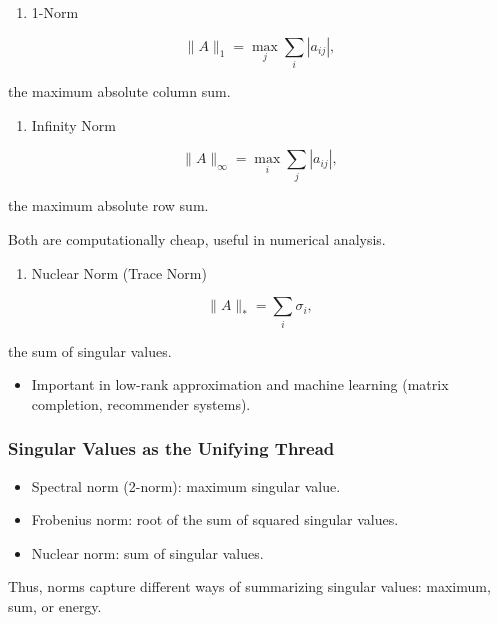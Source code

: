 \documentclass[
  letterpaper,
  DIV=11,
  numbers=noendperiod]{scrreprt}
\providecommand{\tightlist}{%
  \setlength{\itemsep}{0pt}\setlength{\parskip}{0pt}}
\begin{document}
\begin{enumerate}
\def\labelenumi{\arabic{enumi}.}
\setcounter{enumi}{1}
\tightlist
\item
  1-Norm
\end{enumerate}

\[
\|A\|_1 = \max_j \sum_i |a_{ij}|,
\]

the maximum absolute column sum.

\begin{enumerate}
\def\labelenumi{\arabic{enumi}.}
\setcounter{enumi}{2}
\tightlist
\item
  Infinity Norm
\end{enumerate}

\[
\|A\|_\infty = \max_i \sum_j |a_{ij}|,
\]

the maximum absolute row sum.

Both are computationally cheap, useful in numerical analysis.

\begin{enumerate}
\def\labelenumi{\arabic{enumi}.}
\setcounter{enumi}{3}
\tightlist
\item
  Nuclear Norm (Trace Norm)
\end{enumerate}

\[
\|A\|_* = \sum_i \sigma_i,
\]

the sum of singular values.

\begin{itemize}
\tightlist
\item
  Important in low-rank approximation and machine learning (matrix
  completion, recommender systems).
\end{itemize}

\subsubsection{Singular Values as the Unifying
Thread}\label{singular-values-as-the-unifying-thread}

\begin{itemize}
\tightlist
\item
  Spectral norm (2-norm): maximum singular value.
\item
  Frobenius norm: root of the sum of squared singular values.
\item
  Nuclear norm: sum of singular values.
\end{itemize}

Thus, norms capture different ways of summarizing singular values:
maximum, sum, or energy.
\end{document}
